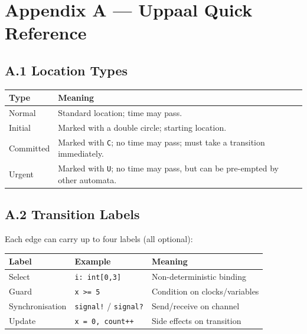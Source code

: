 \documentclass[11pt, a4paper]{article}
\begin{document}
\section*{Appendix A — Uppaal Quick Reference}

\subsection*{A.1 Location Types}

\begin{center}
\begin{tabular}{lp{10cm}}
\toprule
\textbf{Type} & \textbf{Meaning} \\
\midrule
Normal      & Standard location; time may pass. \\
Initial     & Marked with a double circle; starting location. \\
Committed   & Marked with \texttt{C}; no time may pass; must take a transition immediately. \\
Urgent      & Marked with \texttt{U}; no time may pass, but can be pre-empted by other automata. \\
\bottomrule
\end{tabular}
\end{center}

\subsection*{A.2 Transition Labels}

Each edge can carry up to four labels (all optional):

\begin{center}
\begin{tabular}{lll}
\toprule
\textbf{Label} & \textbf{Example} & \textbf{Meaning} \\
\midrule
Select     & \texttt{i: int[0,3]}       & Non-deterministic binding \\
Guard      & \texttt{x >= 5}            & Condition on clocks/variables \\
Synchronisation & \texttt{signal!} / \texttt{signal?} & Send/receive on channel \\
Update     & \texttt{x = 0, count++}    & Side effects on transition \\
\bottomrule
\end{tabular}
\end{center}
\end{document}
